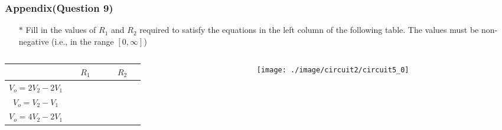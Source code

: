 \documentclass{beamer}
\begin{document}

\begin{frame}
\frametitle{Appendix(Question 9)}
\begin{itemize} \itemsep1pt \parskip0pt 
  \item[$\ast$] Fill in the values of $R_1$ and $R_2$ required to satisfy the equations in the left column of the following table. The values must be non-negative (i.e., in the range $[0,\infty]$)
\end{itemize}

\begin{columns}
\begin{column}{6cm}

\begin{table}
\begin{center}
\def\arraystretch{1.5}

\begin{tabular}{|c|c|c|}
\hline
{} & ~~{\bf $R_1$}~~ & ~~{\bf $R_2$}~~ \\ 
\hline
$V_o = 2V_2-2V_1$ & {} & {} \\
\hline
$V_o = V_2 - V_1$ & {} & {} \\
\hline
$V_o = 4V_2-2V_1$ & {} & {} \\
\hline
\end{tabular}
\end{center}
\end{table}

\end{column}


\begin{column}{6cm}

\begin{figure}[H]
  \centering
  \texttt{[image: ./image/circuit2/circuit5\_0]}
\end{figure}

\end{column}
\end{columns}
\end{frame}

\end{document}
